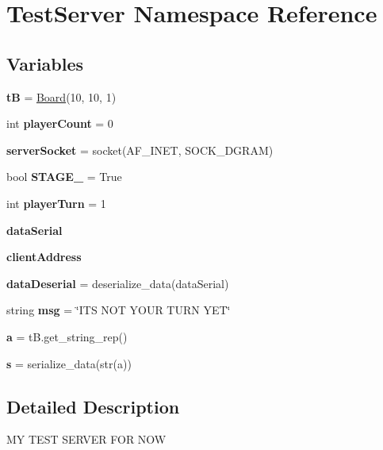 \hypertarget{namespace_test_server}{}\section{Test\+Server Namespace Reference}
\label{namespace_test_server}
\subsection*{Variables}
\begin{DoxyCompactItemize}
\item 
\mbox{\label{namespace_test_server_a729f6a430748e67f05ec43814614ae77}} 
{\bfseries tB} = \hyperlink{class_board_1_1_board}{Board}(10, 10, 1)
\item 
\mbox{\label{namespace_test_server_ad317d82af0e3e887ae39e8732949a47b}} 
int {\bfseries player\+Count} = 0
\item 
\mbox{\label{namespace_test_server_af3d988544584f43011c3af4c20f5e9ff}} 
{\bfseries server\+Socket} = socket(A\+F\+\_\+\+I\+N\+ET, S\+O\+C\+K\+\_\+\+D\+G\+R\+AM)
\item 
\mbox{\label{namespace_test_server_a8a4f04a5aa0349bde80801cdb697c03b}} 
bool {\bfseries S\+T\+A\+G\+E\+\_} = True
\item 
\mbox{\label{namespace_test_server_a98b57febfb36c94ee40c6633a0938375}} 
int {\bfseries player\+Turn} = 1
\item 
\mbox{\label{namespace_test_server_ade98ed4a3b54b3089a29feb31a32cdaa}} 
{\bfseries data\+Serial}
\item 
\mbox{\label{namespace_test_server_a22d89a43afcdb9c0141896102d297bef}} 
{\bfseries client\+Address}
\item 
\mbox{\label{namespace_test_server_aff9f784c87d39d982f53dc3f19897761}} 
{\bfseries data\+Deserial} = deserialize\+\_\+data(data\+Serial)
\item 
\mbox{\label{namespace_test_server_ae3691cefcf56d2ded18b01daf22fa01f}} 
string {\bfseries msg} = \char`\"{}IT\textquotesingle{}S N\+OT Y\+O\+UR T\+U\+RN Y\+ET\char`\"{}
\item 
\mbox{\label{namespace_test_server_ae53bd37b5a73ab3f7cf6e2c2d5d15dca}} 
{\bfseries a} = t\+B.\+get\+\_\+string\+\_\+rep()
\item 
\mbox{\label{namespace_test_server_ab085edde7148e742ce06c40772c1c55b}} 
{\bfseries s} = serialize\+\_\+data(str(a))
\end{DoxyCompactItemize}


\subsection{Detailed Description}
\begin{DoxyVerb}MY TEST SERVER FOR NOW
\end{DoxyVerb}
 